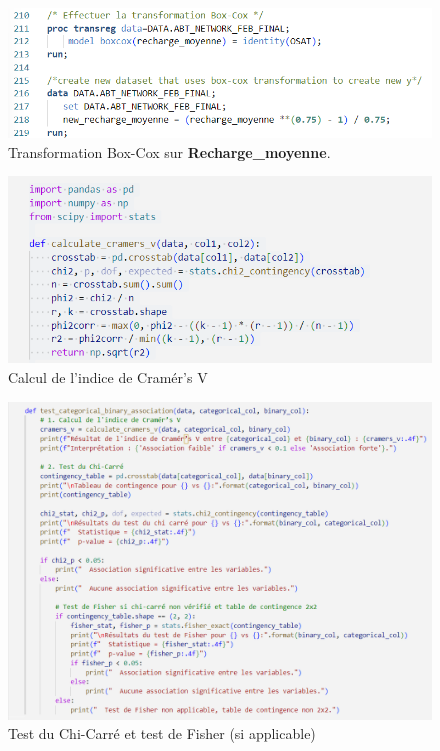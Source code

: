 \begin{figure}[H] 
    \centering 
    \includegraphics[width=0.7\linewidth]{capture_sas_9.png} 
    \caption{Transformation Box-Cox sur \textbf{Recharge\_moyenne}.}
    \label{fig:boxcox_transformation}
\end{figure}


\begin{figure}[H]
    \centering
    \includegraphics[width=0.8\linewidth]{capture_sas_12.png}
    \caption{Calcul de l'indice de Cramér’s V}
    \label{00}
\end{figure}
\vspace{10pt}

\begin{figure}[H]
    \centering
    \includegraphics[width=\textwidth]{capture_sas_13.png}
    \caption{Test du Chi-Carré et test de Fisher (si applicable)}
    \label{222}
\end{figure}
\vspace{10pt}

